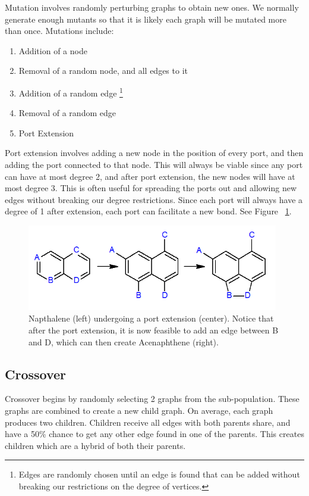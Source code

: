 \documentclass[12pt]{article}
\begin{document}
Mutation involves randomly perturbing graphs to obtain new ones. We normally  generate enough mutants so that it is likely each graph will be mutated more than once. Mutations include:
\begin{enumerate}
\item Addition of a node
\item Removal of a random node, and all edges to it
\item Addition of a random edge \footnote{ Edges are randomly chosen until an edge is found that can be added without breaking our restrictions on the degree of vertices.}
\item Removal of a random edge
\item Port Extension
\end{enumerate}

Port extension involves adding a new node in the position of every port, and then adding the port connected to that node. This will always be viable since any port can have at most degree 2, and after port extension, the new nodes will have at most degree 3. This is often useful for spreading the ports out and allowing new edges without breaking our degree restrictions. Since each port will always have a degree of 1 after extension, each port can facilitate a new bond. See Figure ~\ref{fig:portExtension}.

\begin{figure}[ht!]
\centering
\includegraphics[width=110mm]{portExtension.png}
\caption{Napthalene (left) undergoing a port extension (center). Notice that after the port extension, it is now feasible to add an edge between B and D, which can then create Acenaphthene (right).}
\label{fig:portExtension}
\end{figure}

\subsection{Crossover}

Crossover begins by randomly selecting 2 graphs from the sub-population. These graphs are combined to create a new child graph. On average, each graph produces two children. Children receive all edges with both parents share, and have a 50\% chance to get any other edge found in one of the parents. This creates children which are a hybrid of both their parents.
\end{document}
